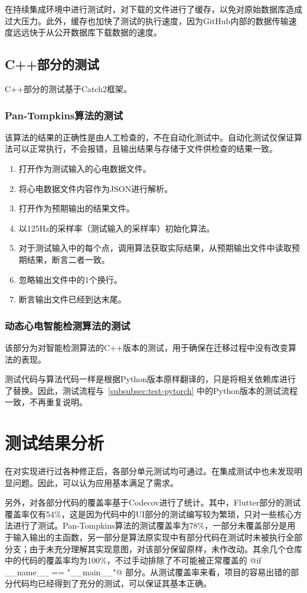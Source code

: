 在持续集成环境中进行测试时，对下载的文件进行了缓存，以免对原始数据库造成过大压力。此外，缓存也加快了测试的执行速度，因为GitHub内部的数据传输速度远远快于从公开数据库下载数据的速度。

\subsection{C++部分的测试}\label{subsec:test-cpp}

C++部分的测试基于Catch2框架。

\subsubsection{Pan-Tompkins算法的测试}

该算法的结果的正确性是由人工检查的，不在自动化测试中。自动化测试仅保证算法可以正常执行，不会报错，且输出结果与存储于文件供检查的结果一致。

\begin{enumerate}
    \item 打开作为测试输入的心电数据文件。
    \item 将心电数据文件内容作为JSON进行解析。
    \item 打开作为预期输出的结果文件。
    \item 以125Hz的采样率（测试输入的采样率）初始化算法。
    \item 对于测试输入中的每个点，调用算法获取实际结果，从预期输出文件中读取预期结果，断言二者一致。
    \item 忽略输出文件中的1个换行。
    \item 断言输出文件已经到达末尾。
\end{enumerate}

\subsubsection{动态心电智能检测算法的测试}

该部分为对智能检测算法的C++版本的测试，用于确保在迁移过程中没有改变算法的表现。

测试代码与算法代码一样是根据Python版本原样翻译的，只是将相关依赖库进行了替换。因此，测试流程与~\ref{subsubsec:test-pytorch} 中的Python版本的测试流程一致，不再重复说明。


\section{测试结果分析}\label{sec:test-result}

在对实现进行过各种修正后，各部分单元测试均可通过。在集成测试中也未发现明显问题。因此，可以认为应用基本满足了需求。

另外，对各部分代码的覆盖率基于Codecov进行了统计。其中，Flutter部分的测试覆盖率仅有54\%，这是因为代码中的UI部分的测试编写较为繁琐，只对一些核心方法进行了测试。Pan-Tompkins算法的测试覆盖率为78\%，一部分未覆盖部分是用于输入输出的主函数，另一部分是算法原实现中有部分代码在测试时未被执行全部分支；由于未充分理解其实现意图，对该部分保留原样，未作改动。其余几个仓库中的代码的覆盖率均为100\%，不过手动排除了不可能被正常覆盖的 @if __name__ == "__main__"@ 部分。从测试覆盖率来看，项目的容易出错的部分代码均已经得到了充分的测试，可以保证其基本正确。
